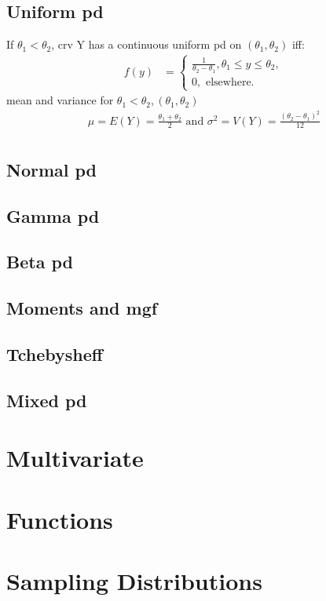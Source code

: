 \documentclass[12pt]{article}
\begin{document}
	\subsection{Uniform pd}
	If $ \theta_1 < \theta_2 $, crv Y has a continuous uniform pd on 
	$ (\theta_1, \theta_2) $ iff:
	\begin{align*}
		f(y) &= 
		\begin{cases}
			\frac{1}{\theta_2 - \theta_1}, \theta_1 \le y \le \theta_2, \\
			0, \text{ elsewhere. } 
		\end{cases}
	\end{align*}
	mean and variance for $ \theta_1 < \theta_2, (\theta_1, \theta_2) $ \\
	\begin{align*}
		\mu = E(Y) = \frac{\theta_1 + \theta_2}{2} \text{ and } 
		\sigma^2 = V(Y) = \frac{(\theta_2 - \theta_1)^2}{12} \\ 
	\end{align*}
	\subsection{Normal pd}
	\subsection{Gamma pd}
	\subsection{Beta pd}
	\subsection{Moments and mgf}
	\subsection{Tchebysheff}
	\subsection{Mixed pd}
	

\section{Multivariate}
\section{Functions}
\section{Sampling Distributions}
\end{document}
